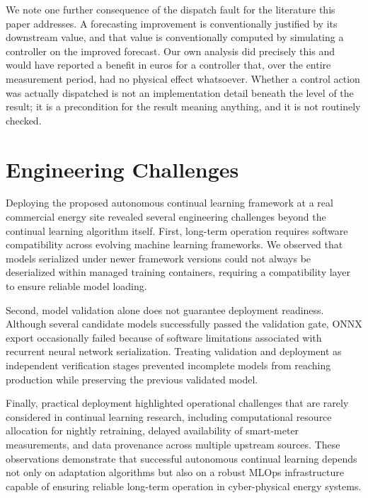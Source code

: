 \documentclass[journal]{IEEEtran}
\begin{document}
We note one further consequence of the dispatch fault for the literature this
paper addresses. A forecasting improvement is conventionally justified by its
downstream value, and that value is conventionally computed by simulating a
controller on the improved forecast. Our own analysis did precisely this and
would have reported a benefit in euros for a controller that, over the entire
measurement period, had no physical effect whatsoever. Whether a control action
was actually dispatched is not an implementation detail beneath the level of the
result; it is a precondition for the result meaning anything, and it is not
routinely checked.

























\section{Engineering Challenges}
\label{sec:lessons}

Deploying the proposed autonomous continual learning framework at a
real commercial energy site revealed several engineering challenges beyond
the continual learning algorithm itself. First, long-term operation
requires software compatibility across evolving machine learning
frameworks. We observed that models serialized under newer framework
versions could not always be deserialized within managed training
containers, requiring a compatibility layer to ensure reliable model
loading.

Second, model validation alone does not guarantee deployment
readiness. Although several candidate models successfully passed the
validation gate, ONNX export occasionally failed because of software
limitations associated with recurrent neural network serialization.
Treating validation and deployment as independent verification stages
prevented incomplete models from reaching production while preserving
the previous validated model.

Finally, practical deployment highlighted operational challenges that
are rarely considered in continual learning research, including
computational resource allocation for nightly retraining, delayed
availability of smart-meter measurements, and data provenance across
multiple upstream sources. These observations demonstrate that
successful autonomous continual learning depends not only on adaptation
algorithms but also on a robust MLOps infrastructure capable of
ensuring reliable long-term operation in cyber-physical energy systems.
\end{document}
